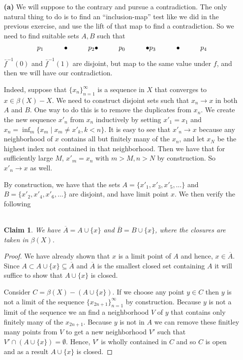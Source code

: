 \documentclass{article}
\newcommand{\exercise}[1]{\noindent{\textbf{Exercise #1:}}}
\newcommand{\seq}[2]{\{#1_{#2}\}_{#2 = 1}^\infty}
\newtheorem*{claim}{\\ Claim}
\begin{document}
\exercise{38.9}
\begin{enumerate}
\item [\textbf{(a)}] We will suppose to the contrary and pursue a
  contradiction. The only natural thing to do is to find an
  ``inclusion-map'' test like we did in the previous exercise, and use
  the lift of that map to find a contradiction. So we need to find
  suitable sets $A,B$ such that
  \[
  \xymatrix{
    p_1 & \bullet & p_2
    \bullet & p_0 & \bullet
    p_3 & \bullet & p_4
  }
  \]
  $\bar{f}^{-1}(0)$ and $\bar{f}^{-1}(1)$ are disjoint, but map to the
  same value under $f$, and then we will have our contradiction.

  Indeed, suppose that $\seq{x}{n}$ is a sequence in $X$ that
  converges to $x \in \beta(X) - X$. We need to construct disjoint
  sets such that $x_n \to x$ in both $A$ and $B$. One way to do this
  is to remove the duplicates from $x_n$. We create the new sequence
  $x'_n$ from $x_n$ inductively by setting $x'_1 = x_1$ and $x_n =
  \inf_m \{x_m \mathrel{|} x_m \neq x'_k, k < n\}$. It is easy to see
  that $x'_n \to x$ because any neighborhood of $x$ contains all but
  finitely many of the $x_n$, and let $x_N$ be the highest index not
  contained in that neighborhood. Then we have that for sufficiently
  large $M$, $x'_m = x_n$ with $m > M, n > N$ by construction. So
  $x'_n \to x$ as well.

  By construction, we have that the sets $A = \{x'_1, x'_3, x'_5,
  \ldots\}$ and $B = \{x'_2, x'_4, x'_6,\ldots\}$ are disjoint, and
  have limit point $x$. We then verify the following
  \begin{claim}
    We have $\overline{A} = A \cup \{x\}$ and $\overline{B} = B \cup
    \{x\}$, where the closures are taken in $\beta(X)$.
  \end{claim}
  \begin{proof}
    We have already shown that $x$ is a limit point of $A$ and hence,
    $x \in \overline{A}$. Since $A \subset A \cup \{x\} \subseteq
    \overline{A}$ and $\overline{A}$ is the smallest closed set
    containing $A$ it will suffice to show that $A \cup \{x\}$ is
    closed.

    Consider $C = \beta(X) - (A \cup \{x\})$. If we choose any point
    $y \in C$ then $y$ is not a limit of the sequence
    $\{x_{2n+1}\}_{n=1}^\infty$ by construction. Because $y$ is not a limit of
    the sequence we an find a neighborhood $V$ of $y$ that contains
    only finitely many of the $x_{2n+1}$. Because $y$ is not in $A$ we
    can remove these finitley many points from $V$ to get a new
    neighborhood $V'$ such that $V' \cap (A \cup \{x\}) =
    \emptyset$. Hence, $V'$ is wholly contained in $C$ and so $C$ is
    open and as a result $A \cup \{x\}$ is closed.


\end{proof}
\end{enumerate}
\end{document}

